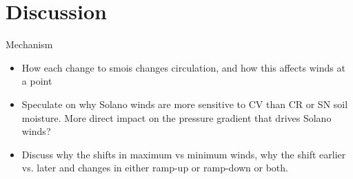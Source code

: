 
%
%
%
%
%

\section{Discussion}

Mechanism
\begin{itemize}
\item How each change to smois changes circulation, and how this affects winds at a point
\item Speculate on why Solano winds are more sensitive to CV than CR or SN soil moisture.  More direct impact on the pressure gradient that drives Solano winds?
\item Discuss why the shifts in maximum vs minimum winds, why the shift earlier vs. later and changes in either ramp-up or ramp-down or both.
\end{itemize}

